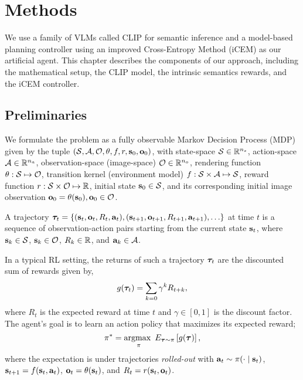 \chapter{Methods}
\label{sec:methods}

We use a family of VLMs called CLIP \citep{clip} for semantic inference and a model-based planning controller using an improved Cross-Entropy Method (iCEM) \citep{icem} as our artificial agent.
This chapter describes the components of our approach, including the mathematical setup, the CLIP model, the intrinsic semantics rewards, and the iCEM controller.

\section{Preliminaries}
\label{sec:preliminaries}
We formulate the problem as a fully observable Markov Decision Process (MDP) given by the tuple \((\mathcal{S}, \mathcal{A}, \mathcal{O}, \theta, f, r, \mathbf{s}_0, \mathbf{o}_0)\), with state-space \(\mathcal{S} \in \mathbb{R}^{n_s}\), action-space \(\mathcal{A} \in \mathbb{R}^{n_a}\), observation-space (image-space) \(\mathcal{O} \in \mathbb{R}^{n_o}\), rendering function \(\theta: \mathcal{S} \mapsto \mathcal{O}\), transition kernel (environment model) \(f: \mathcal{S} \times \mathcal{A} \mapsto \mathcal{S}\), reward function \(r: \mathcal{S} \times \mathcal{O} \mapsto \mathbb{R}\), initial state \(\mathbf{s}_0 \in \mathcal{S}\), and its corresponding initial image observation \(\mathbf{o}_0 = \theta(\mathbf{s}_0), \mathbf{o}_0 \in \mathcal{O}\).

A trajectory \(\bm{\tau}_t = \{(\mathbf{s}_t, \mathbf{o}_t, R_t, \mathbf{a}_t), (\mathbf{s}_{t+1}, \mathbf{o}_{t+1}, R_{t+1}, \mathbf{a}_{t+1}), \ldots \}\) at time \(t\) is a sequence of observation-action pairs starting from the current state \(\mathbf{s}_t\), where \(\mathbf{s}_k \in \mathcal{S}\), \(\mathbf{s}_k \in \mathcal{O}\), \(R_k \in \mathbb{R}\), and \(\mathbf{a}_k \in \mathcal{A}\).

In a typical RL setting, the returns of such a trajectory \(\bm{\tau}_t\) are the discounted sum of rewards given by,
\begin{equation}
    \label{eq:rl-goal}
    g(\bm{\tau}_t) = \sum_{k=0} \gamma^k R_{t+k},
\end{equation}
where \(R_t\) is the expected reward at time \(t\) and \(\gamma \in [0, 1]\) is the discount factor. The agent’s goal is to learn an action policy that maximizes its expected reward;
\begin{equation}
    \label{eq:rl-policy}
    \pi^* = \operatorname*{argmax~}_{\pi} E_{\bm{\tau} \sim \pi} \left[ g(\bm{\tau}) \right],
\end{equation}
where the expectation is under trajectories \emph{rolled-out} with \(\mathbf{a}_t \sim \pi(\cdot \mid \mathbf{s}_t)\), \(\mathbf{s}_{t+1} = f(\mathbf{s}_t, \mathbf{a}_t)\), \(\mathbf{o}_t = \theta(\mathbf{s}_t)\), and \(R_t = r(\mathbf{s}_t, \mathbf{o}_t)\).

